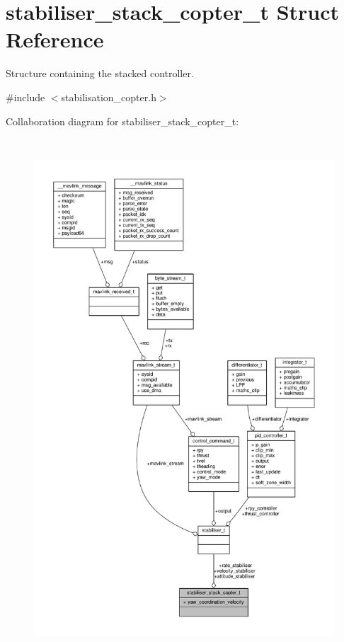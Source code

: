 \hypertarget{structstabiliser__stack__copter__t}{\section{stabiliser\+\_\+stack\+\_\+copter\+\_\+t Struct Reference}
\label{structstabiliser__stack__copter__t}
}


Structure containing the stacked controller.  




{\ttfamily \#include $<$stabilisation\+\_\+copter.\+h$>$}



Collaboration diagram for stabiliser\+\_\+stack\+\_\+copter\+\_\+t\+:
\nopagebreak
\begin{figure}[H]
\begin{center}
\leavevmode
\includegraphics[height=550pt]{structstabiliser__stack__copter__t__coll__graph}
\end{center}
\end{figure}

